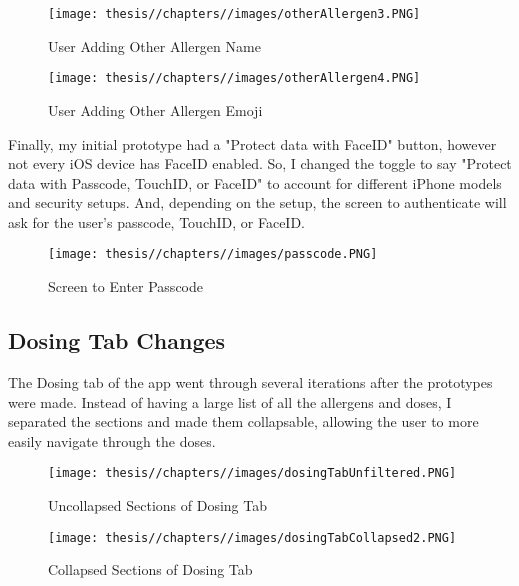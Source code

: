\begin{figure} [H]
    \centering
    \texttt{[image: thesis//chapters//images/otherAllergen3.PNG]}
    \caption{User Adding Other Allergen Name}
    \label{fig:enter-label}
\end{figure}

\begin{figure} [H]
    \centering
    \texttt{[image: thesis//chapters//images/otherAllergen4.PNG]}
    \caption{User Adding Other Allergen Emoji}
    \label{fig:enter-label}
\end{figure}

Finally, my initial prototype had a "Protect data with FaceID" button, however not every iOS device has FaceID enabled. So, I changed the toggle to say "Protect data with Passcode, TouchID, or FaceID" to account for different iPhone models and security setups. And, depending on the setup, the screen to authenticate will ask for the user's passcode, TouchID, or FaceID.

\begin{figure} [H]
    \centering
    \texttt{[image: thesis//chapters//images/passcode.PNG]}
    \caption{Screen to Enter Passcode}
    \label{fig:enter-label}
\end{figure}

\subsection{Dosing Tab Changes}

The Dosing tab of the app went through several iterations after the prototypes were made. Instead of having a large list of all the allergens and doses, I separated the sections and made them collapsable, allowing the user to more easily navigate through the doses.

\begin{figure} [H]
    \centering
    \texttt{[image: thesis//chapters//images/dosingTabUnfiltered.PNG]}
    \caption{Uncollapsed Sections of Dosing Tab}
    \label{fig:enter-label}
\end{figure}

\begin{figure} [H]
    \centering
    \texttt{[image: thesis//chapters//images/dosingTabCollapsed2.PNG]}
    \caption{Collapsed Sections of Dosing Tab}
    \label{fig:enter-label}
\end{figure}

